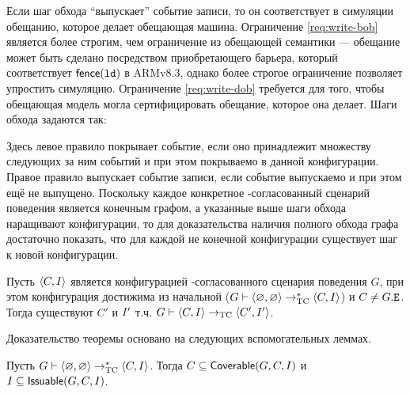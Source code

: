 Если шаг обхода  ``выпускает'' событие записи, то он соответствует в симуляции обещанию, которое делает обещающая машина.
Ограничение \ref{req:write-bob} является более строгим, чем ограничение из обещающей семантики ---
обещание может быть сделано  посредством приобретающего барьера, который соответствует $\mathsf{fence}({\mathtt{ld}})$ в ARMv8.3,
однако более строгое ограничение позволяет упростить симуляцию.
Ограничение \ref{req:write-dob} требуется для того, чтобы обещающая модель могла сертифицировать обещание, которое она
делает.
Шаги обхода задаются так:
Здесь левое правило покрывает событие, если оно принадлежит множеству
следующих за ним событий и при этом покрываемо в данной конфигурации.
Правое правило выпускает событие записи, если событие выпускаемо и при этом ещё не выпущено.
Поскольку каждое конкретное \ARM-согласованный сценарий поведения
является конечным графом,
а указанные выше шаги обхода наращивают конфигурации, то для доказательства наличия полного
обхода графа достаточно показать, что для каждой не конечной конфигурации существует шаг к новой конфигурации.
\begin{theorem}
  \label{prop:trav-step}
  Пусть ${\langle{C, I}\rangle}$ является конфигурацией \ARM-согласованного сценария поведения $G$,
  при этом конфигурация достижима из начальной
  ($G \vdash {\langle{\varnothing, \varnothing}\rangle} \rightarrow_{\rm TC}^{*} {\langle{C, I}\rangle}$) и $C \neq G.{\mathtt{E}}$.
  Тогда существуют $C'$ и $I'$ т.ч. 
  $G \vdash {\langle{C, I}\rangle} \rightarrow_{\rm TC} {\langle{C', I'}\rangle}$.
\end{theorem}
Доказательство теоремы основано на следующих вспомогательных леммах.%
\begin{lemma}
  \label{prop:trav-prop-preserve}
  Пусть $G \vdash {\langle{\varnothing, \varnothing}\rangle} \rightarrow_{\rm TC}^{*} {\langle{C, I}\rangle}$.
  Тогда $C \subseteq {\sf Coverable}(G,C,I)$ и $I \subseteq {\sf Issuable}(G,C,I)$.
\end{lemma}

